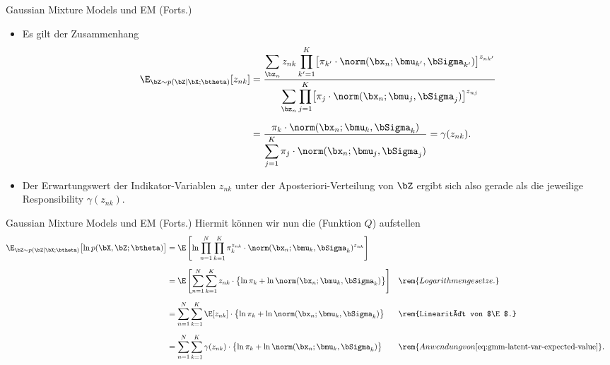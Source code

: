 \begin{frame}{Gaussian Mixture Models und EM (Forts.)}{}
	\begin{itemize}
		\item Es gilt der Zusammenhang
		\begin{equation} \label{eq:gmm-latent-var-expected-value}
			\begin{aligned}
				\E_{\bZ \sim p(\bZ \mid \bX; \btheta)}[z_{nk}]
					&= \frac{
						\displaystyle\sum_{\bz_n} z_{nk} \prod_{k'=1}^K \bigl[ \pi_{k'} \cdot \norm(\bx_n; \bmu_{k'}, \bSigma_{k'}) \bigr]^{z_{nk'}}
					}{
						\displaystyle\sum_{\bz_n} \prod_{j=1}^K \bigl[ \pi_j \cdot \norm(\bx_n; \bmu_j, \bSigma_j) \bigr]^{z_{nj}}
					}
			\\[2mm]
					&= \frac{\pi_k \cdot \norm(\bx_n; \bmu_k, \bSigma_k)}{\displaystyle\sum_{j=1}^K \pi_j \cdot \norm(\bx_n; \bmu_j, \bSigma_j)}
						= \gamma(z_{nk}).
			\end{aligned}
		\end{equation}
		\item Der Erwartungswert der Indikator-Variablen $z_{nk}$ unter der Aposteriori-Verteilung von $\bZ$
			ergibt sich also gerade als die jeweilige Responsibility $\gamma(z_{nk})$.
	\end{itemize}
\end{frame}


\begin{frame}{Gaussian Mixture Models und EM (Forts.)}{}
	Hiermit können wir nun die  (Funktion $Q$) aufstellen
	\begin{equation} \label{eq:gmm-expected-complete-log-likelihood}
		\begin{aligned}
			\E_{\bZ \sim p(\bZ \mid \bX; \btheta)}\bigl[ \ln p(\bX, \bZ; \btheta) \bigr]
				&= \E\left[
					\ln \prod_{n=1}^N \prod_{k=1}^K \pi_k^{z_{nk}} \cdot \norm(\bx_n; \bmu_k, \bSigma_k)^{z_{nk}}
				\right]
		\\[2mm]
				&= \E\left[
					\sum_{n=1}^N \sum_{k=1}^K z_{nk} \cdot \bigl\{ \ln \pi_k + \ln \norm(\bx_n; \bmu_k, \bSigma_k) \bigr\}
				\right]
				&& \rem{Logarithmengesetze.}
		\\[2mm]
				&= \sum_{n=1}^N \sum_{k=1}^K \E[z_{nk}] \cdot \bigl\{ \ln \pi_k + \ln \norm(\bx_n; \bmu_k, \bSigma_k) \bigr\}
				&& \rem{Linearität von $\E$.}
		\\[2mm]
				&= \sum_{n=1}^N \sum_{k=1}^K \gamma(z_{nk}) \cdot \bigl\{ \ln \pi_k + \ln \norm(\bx_n; \bmu_k, \bSigma_k) \bigr\}
				&& \rem{Anwendung von \eqref{eq:gmm-latent-var-expected-value}}.
		\end{aligned}
	\end{equation}
\end{frame}


